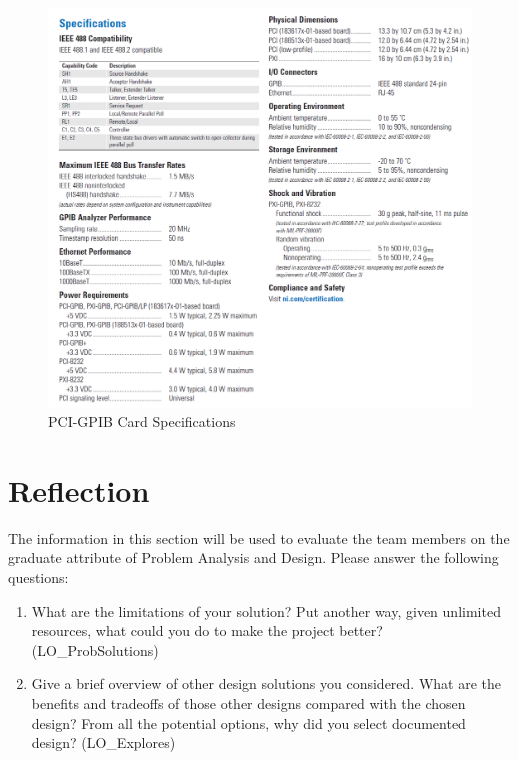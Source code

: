 \documentclass[12pt, titlepage]{article}
\begin{document}
\begin{figure}[H]
\centerline{\includegraphics[scale=1]{specs.png}}
\caption{PCI-GPIB Card Specifications}
\label{fig}
\end{figure}

\section{Reflection}

The information in this section will be used to evaluate the team members on the
graduate attribute of Problem Analysis and Design.  Please answer the following questions:

\begin{enumerate}
  \item What are the limitations of your solution?  Put another way, given
  unlimited resources, what could you do to make the project better? (LO\_ProbSolutions)
  \item Give a brief overview of other design solutions you considered.  What
  are the benefits and tradeoffs of those other designs compared with the chosen
  design?  From all the potential options, why did you select documented design?
  (LO\_Explores)
\end{enumerate}
\end{document}

